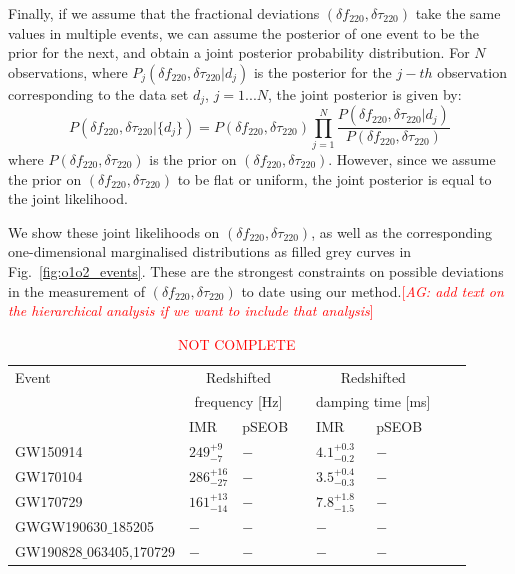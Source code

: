 \documentclass[twocolumn,prd,superscriptaddress,amsfonts,amssymb,amsmath,preprintnumbers]{revtex4-1}
\newcommand{\abhi}[1]{\textcolor{red}{[\textit{AG: #1}]}}
\newcommand{\df}[1]{\delta f_{\text{#1}}}
\newcommand{\dtau}[1]{\delta \tau_{\text{#1}}}
\begin{document}
Finally, if we assume that the fractional deviations $(\df{220}, \dtau{220})$ take the same values in multiple events, we can assume the posterior of one event to be the prior for the next, and obtain a joint posterior probability distribution. For $N$ observations, where $P_j(\df{220}, \dtau{220} | d_j)$ is the posterior for the $j-th$ observation corresponding to the data set $d_j$, $j=1...N$, the joint posterior is given by:
\begin{equation}
P(\df{220}, \dtau{220} | \{d_j\}) = P(\df{220}, \dtau{220}) \prod _{j=1}^N \frac{P(\df{220}, \dtau{220} | d_j) }{P(\df{220}, \dtau{220})}
\end{equation}
where $P(\df{220}, \dtau{220})$ is the prior on $(\df{220}, \dtau{220})$. However, since we assume the prior on $(\df{220}, \dtau{220})$ to be flat or uniform, the joint posterior is equal to the joint likelihood.

We show these joint likelihoods on $(\df{220}, \dtau{220})$, as well as the corresponding one-dimensional marginalised distributions as filled grey curves in Fig.~\ref{fig:o1o2_events}. These are the strongest constraints on possible deviations in the measurement of $(\df{220}, \dtau{220})$ to date using our method.\abhi{add text on the hierarchical analysis if we want to include that analysis}

\begin{table}
\begin{flushleft}
\begin{tabular}{llllllll}
\toprule
Event & \multicolumn{2}{c}{Redshifted} & \hphantom{X} & \multicolumn{2}{c}{Redshifted} \\
& \multicolumn{2}{c}{frequency [Hz]} & \hphantom{X} & \multicolumn{2}{c}{damping time [ms]} \\[0.075cm]
\hline
& IMR  & pSEOB & \hphantom{X} & IMR  & pSEOB \\
\hline

GW150914 &
$249^{+9}_{-7}$ &
$-$ &
\hphantom{X} &
$4.1^{+0.3}_{-0.2}$ &
$-$
\\[0.075cm]

GW170104 &
$286^{+16}_{-27}$ &
$-$ &
\hphantom{X} &
$3.5^{+0.4}_{-0.3}$ &
$-$
\\[0.075cm]

GW170729 &
$161^{+13}_{-14}$ &
$-$ &
\hphantom{X} &
$7.8^{+1.8}_{-1.5}$ &
$-$
\\[0.075cm]

GWGW190630$\_$185205 &
$-$ &
$-$ &
\hphantom{X} &
$-$ &
$-$
\\[0.075cm]

GW190828$\_$063405,170729 &
$-$ &
$-$ &
\hphantom{X} &
$-$ &
$-$
\\[0.075cm]
\hline
\bottomrule
\end{tabular}
\caption{\textcolor{red}{NOT COMPLETE}}
\label{tab:qnm_o1o2_results}
\end{flushleft}
\end{table}
\end{document}
